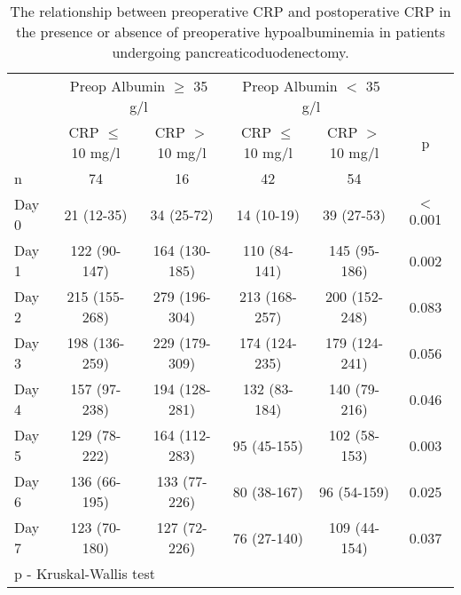 
\begin{table}[p]
	\caption{The relationship  between preoperative CRP and postoperative CRP in the presence or absence of preoperative hypoalbuminemia in patients undergoing pancreaticoduodenectomy. }
	\label{table:sirs_crp_with_alb}
	\centering
	\renewcommand{\arraystretch}{1.4} %
	
	\begin{tabular}{|l c c c c c|}
		\hline
		      & \multicolumn{2}{c}{Preop Albumin $\geq$ 35 g/l} & \multicolumn{2}{c}{Preop Albumin $<$ 35 g/l} &  \\
		      & CRP $\leq$ 10 mg/l & CRP $>$ 10 mg/l            & CRP $\leq$ 10 mg/l & CRP $>$ 10 mg/l         & p        \\
		n     & 74                 & 16                         & 42                 & 54                      &  \\ \hline
		Day 0 & 21 (12-35)         & 34 (25-72)                 & 14 (10-19)         & 39 (27-53)              & $<$0.001 \\
		Day 1 & 122 (90-147)       & 164 (130-185)              & 110 (84-141)       & 145 (95-186)            & 0.002    \\
		Day 2 & 215 (155-268)      & 279 (196-304)              & 213 (168-257)      & 200 (152-248)           & 0.083    \\
		Day 3 & 198 (136-259)      & 229 (179-309)              & 174 (124-235)      & 179 (124-241)           & 0.056    \\
		Day 4 & 157 (97-238)       & 194 (128-281)              & 132 (83-184)       & 140 (79-216)            & 0.046    \\
		Day 5 & 129 (78-222)       & 164 (112-283)              & 95 (45-155)        & 102 (58-153)            & 0.003    \\
		Day 6 & 136 (66-195)       & 133 (77-226)               & 80 (38-167)        & 96 (54-159)             & 0.025    \\
		Day 7 & 123 (70-180)       & 127 (72-226)               & 76 (27-140)        & 109 (44-154)            & 0.037    \\ \hline
		\multicolumn{6}{l}{p - Kruskal-Wallis test}
	\end{tabular}	
\end{table}